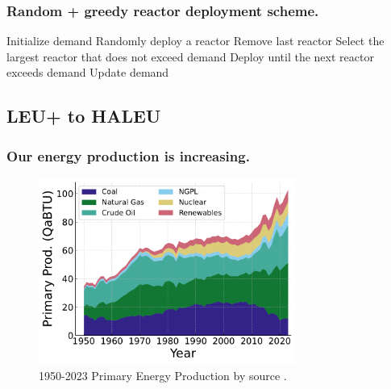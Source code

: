 \documentclass[9pt]{beamer}
\begin{document}
  \begin{frame}
    \frametitle{Random + greedy reactor deployment scheme.}
        \begin{algorithmic}[1]
            \State Initialize demand
                \State Randomly deploy a reactor
                    \State Remove last reactor
                        \State Select the largest reactor that does not exceed demand
                        \State Deploy until the next reactor exceeds demand
                        \State Update demand
                    \EndIf
                \EndIf
            \EndWhile
        \end{algorithmic}
  \end{frame}

  \subsection{LEU+ to HALEU}
  \begin{frame}
    \frametitle{Our energy production is increasing.}
    \begin{figure}
        \centering
        \includegraphics[width=0.75\textwidth]{images/prim_prod_b_source.pdf}
        \caption{1950-2023 Primary Energy Production by source \cite{mer_april_2024}.}
    \end{figure}
  \end{frame}
\end{document}

